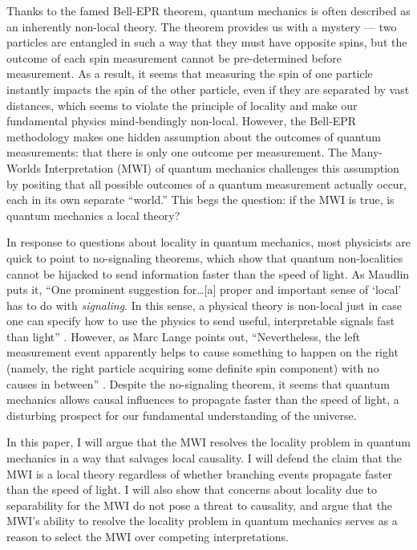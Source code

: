 Thanks to the famed Bell-EPR theorem, quantum mechanics is often described as
an inherently non-local theory. The theorem provides us with a mystery — two
particles are entangled in such a way that they must have opposite spins, but
the outcome of each spin measurement cannot be pre-determined before
measurement. As a result, it seems that measuring the spin of one particle
instantly impacts the spin of the other particle, even if they are separated by
vast distances, which seems to violate the principle of locality and make our
fundamental physics mind-bendingly non-local. However, the Bell-EPR methodology
makes one hidden assumption about the outcomes of quantum measurements: that
there is only one outcome per measurement. The Many-Worlds Interpretation (MWI)
of quantum mechanics challenges this assumption by positing that all possible
outcomes of a quantum measurement actually occur, each in its own separate
``world.'' This begs the question: if the MWI is true, is quantum mechanics a
local theory?

In response to questions about locality in quantum mechanics, most physicists
are quick to point to no-signaling theorems, which show that quantum
non-localities cannot be hijacked to send information faster than the speed of
light. As Maudlin puts it, ``One prominent suggestion for\ldots [a] proper and
important sense of `local' has to do with \emph{signaling}. In this sense, a
physical theory is non-local just in case one can specify how to use the physics
to send useful, interpretable signals fast than light'' \citep{Maudlin_2014}.
However, as Marc Lange points out, ``Nevertheless, the left measurement event
apparently helps to cause something to happen on the right (namely, the right
particle acquiring some definite spin component) with no causes in between''
\citep{Lange_2002}. Despite the no-signaling theorem, it seems that quantum
mechanics allows causal influences to propagate faster than the speed of light,
a disturbing prospect for our fundamental understanding of the universe.

In this paper, I will argue that the MWI resolves the locality problem in
quantum mechanics in a way that salvages local causality. I will defend the 
claim that the MWI is a local theory regardless of whether branching events
propagate faster than the speed of light. I will also show that concerns about
locality due to separability for the MWI do not pose a threat to causality, and
argue that the MWI's ability to resolve the locality problem in quantum
mechanics serves as a reason to select the MWI over competing interpretations.

